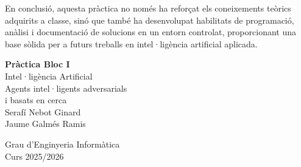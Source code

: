 \documentclass[12pt,a4paper]{report}
\begin{document}
En conclusió, aquesta pràctica no només ha reforçat els coneixements teòrics adquirits a classe, sinó que també ha desenvolupat 
habilitats de programació, anàlisi i documentació de solucions en un entorn controlat, proporcionant una base sòlida per a futurs 
treballs en intel·ligència artificial aplicada.


\cleardoublepage
\thispagestyle{empty} %

\begin{center}
\vspace*{5cm} %

{\LARGE \textbf{Pràctica Bloc I}}\\[1em]
{\Large Intel·ligència Artificial}\\[4cm]

{\large Agents intel·ligents adversarials\\ i basats en cerca}\\[5cm]

{\large %
Serafí Nebot Ginard\\
Jaume Galmés Ramis\\[4cm]}

{\large Grau d'Enginyeria Informàtica\\Curs 2025/2026}

\end{center}
\end{document}
